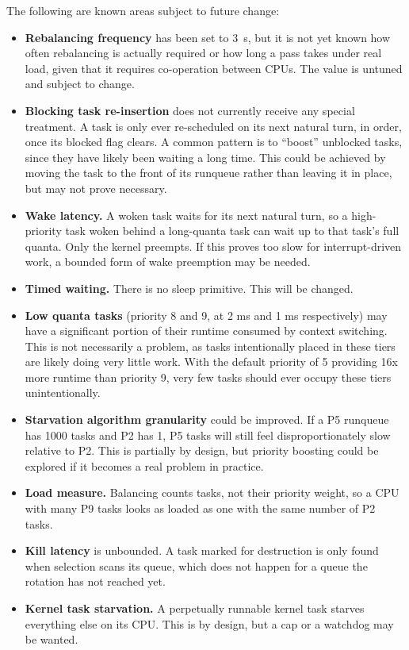 \documentclass[11pt]{article}
\begin{document}
The following are known areas subject to future change:

\begin{itemize}
	\item \textbf{Rebalancing frequency} has been set to 3~s, but it is not yet known how often rebalancing is actually required or how long a pass takes under real load, given that it requires co-operation between CPUs. The value is untuned and subject to change.
	\item \textbf{Blocking task re-insertion} does not currently receive any special treatment. A task is only ever re-scheduled on its next natural turn, in order, once its blocked flag clears. A common pattern is to ``boost'' unblocked tasks, since they have likely been waiting a long time. This could be achieved by moving the task to the front of its runqueue rather than leaving it in place, but may not prove necessary.
	\item \textbf{Wake latency.} A woken task waits for its next natural turn, so a high-priority task woken behind a long-quanta task can wait up to that task's full quanta. Only the kernel preempts. If this proves too slow for interrupt-driven work, a bounded form of wake preemption may be needed.
	\item \textbf{Timed waiting.} There is no sleep primitive. This will be changed.
	\item \textbf{Low quanta tasks} (priority 8 and 9, at 2 ms and 1 ms respectively) may have a significant portion of their runtime consumed by context switching. This is not necessarily a problem, as tasks intentionally placed in these tiers are likely doing very little work. With the default priority of 5 providing 16x more runtime than priority 9, very few tasks should ever occupy these tiers unintentionally.
	\item \textbf{Starvation algorithm granularity} could be improved. If a P5 runqueue has 1000 tasks and P2 has 1, P5 tasks will still feel disproportionately slow relative to P2. This is partially by design, but priority boosting could be explored if it becomes a real problem in practice.
	\item \textbf{Load measure.} Balancing counts tasks, not their priority weight, so a CPU with many P9 tasks looks as loaded as one with the same number of P2 tasks.
	\item \textbf{Kill latency} is unbounded. A task marked for destruction is only found when selection scans its queue, which does not happen for a queue the rotation has not reached yet.
	\item \textbf{Kernel task starvation.} A perpetually runnable kernel task starves everything else on its CPU. This is by design, but a cap or a watchdog may be wanted.

\end{itemize}
\end{document}
